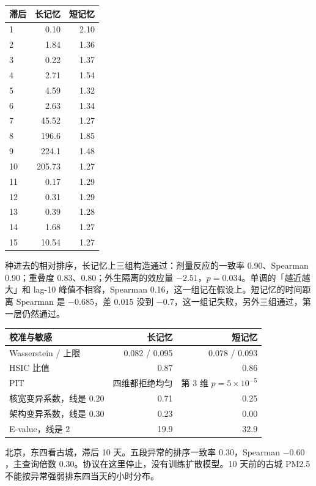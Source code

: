\documentclass[11pt]{article}
\begin{document}
\begin{center}
\small
\begin{tabular}{@{}lrr@{}}
\toprule
滞后 & 长记忆 & 短记忆 \\
\midrule
1 & 0.10 & 2.10 \\
2 & 1.84 & 1.36 \\
3 & 0.22 & 1.37 \\
4 & 2.71 & 1.54 \\
5 & 4.59 & 1.32 \\
6 & 2.63 & 1.34 \\
7 & 45.52 & 1.27 \\
8 & 196.6 & 1.85 \\
9 & 224.1 & 1.48 \\
10 & 205.73 & 1.27 \\
11 & 0.17 & 1.29 \\
12 & 0.31 & 1.29 \\
13 & 0.39 & 1.28 \\
14 & 1.68 & 1.27 \\
15 & 10.54 & 1.27 \\
\bottomrule
\end{tabular}
\end{center}

种进去的相对排序，长记忆上三组构造通过：剂量反应的一致率 0.90、Spearman 0.90；重叠度 0.83、0.80；外生隔离的效应量 \(-2.51\)，\(p=0.034\)。单调的「越近越大」和 lag-10 峰值不相容，Spearman 0.16，这一组记在假设上。短记忆的时间距离 Spearman 是 \(-0.685\)，差 \(0.015\) 没到 \(-0.7\)，这一组记失败，另外三组通过，第一层仍然通过。

\begin{center}
\small
\begin{tabular}{@{}lrr@{}}
\toprule
校准与敏感 & 长记忆 & 短记忆 \\
\midrule
Wasserstein / 上限 & 0.082 / 0.095 & 0.078 / 0.093 \\
HSIC 比值 & 0.87 & 0.86 \\
PIT & 四维都拒绝均匀 & 第 3 维 \(p=5\times 10^{-5}\) \\
核宽变异系数，线是 0.20 & 0.71 & 0.25 \\
架构变异系数，线是 0.30 & 0.23 & 0.00 \\
E-value，线是 2 & 19.9 & 32.9 \\
\bottomrule
\end{tabular}
\end{center}

北京，东四看古城，滞后 10 天。五段异常的排序一致率 0.30，Spearman \(-0.60\)，主查询倍数 0.30。协议在这里停止，没有训练扩散模型。10 天前的古城 PM2.5 不能按异常强弱排东四当天的小时分布。
\end{document}
